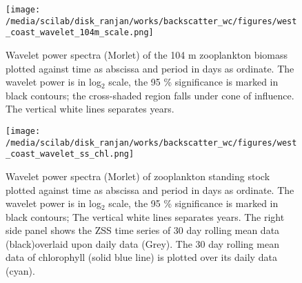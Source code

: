 \documentclass{article}
\begin{document}
\begin{figure}[htbp]
	\centering
	\texttt{[image: /media/scilab/disk\_ranjan/works/backscatter\_wc/figures/west\_coast\_wavelet\_104m\_scale.png]} 
	\captionsetup{justification=justified,font=footnotesize,skip=0.05\baselineskip,width=\textwidth}
	\caption{Wavelet power spectra (Morlet) of the 104 m zooplankton biomass plotted against time as abscissa and period in days as ordinate. The wavelet power is in log$_2$ scale, the 95 \% significance is marked in black contours; the cross-shaded region falls under cone of influence. The vertical white lines separates years.}
	\label{fig:wave104}
\end{figure}

\begin{figure}[htbp]
	\centering
	\texttt{[image: /media/scilab/disk\_ranjan/works/backscatter\_wc/figures/west\_coast\_wavelet\_ss\_chl.png]} 
	\captionsetup{justification=justified,font=footnotesize,skip=0.05\baselineskip,width=\textwidth}
	\caption{Wavelet power spectra (Morlet) of zooplankton standing stock plotted against time as abscissa and period in days as ordinate. The wavelet power is in log$_2$ scale, the 95 \% significance is marked in black contours; The vertical white lines separates years. The right side panel shows the ZSS time series of 30 day rolling mean data (black)overlaid upon daily data (Grey). The 30 day rolling mean data of chlorophyll (solid blue line) is plotted over its daily data (cyan).}
	\label{fig:wavess}
\end{figure}



\end{document}
